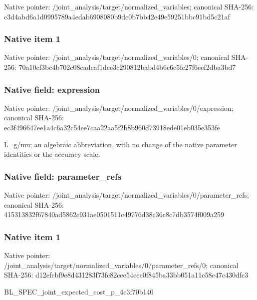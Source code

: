 \documentclass[10pt,a4paper]{article}
\begin{document}
Native pointer: /joint\_analysis/target/n\allowbreak{}ormalized\_variables; canonical SHA-256: c3d4abd6a1d0995789a4edab\allowbreak{}6908080b9dc0b7bb42e49e59\allowbreak{}251bbc91bd5c21af



\subsubsection{Native item 1}


Native pointer: /joint\_analysis/target/n\allowbreak{}ormalized\_variables/0; canonical SHA-256: 70a10cf3bc4b702c08cadcaf\allowbreak{}1dce3c290812babd4b6c6c5f\allowbreak{}c27f6eef2dba3bd7



\subsubsection{Native field: expression}


Native pointer: /joint\_analysis/target/n\allowbreak{}ormalized\_variables/0/ex\allowbreak{}pression; canonical SHA-256: ec3f496647ee1a4c6a32c54e\allowbreak{}e7caa22aa5f2b8b960d73918\allowbreak{}ede01eb035e353fe


L\_g/mu; an algebraic abbreviation, with no change of the native parameter identities or the accuracy scale.


\subsubsection{Native field: parameter\_refs}


Native pointer: /joint\_analysis/target/n\allowbreak{}ormalized\_variables/0/pa\allowbreak{}rameter\_refs; canonical SHA-256: 415313832f67840ad5862c93\allowbreak{}1ae0501511c49776d38c36c8\allowbreak{}c7db3574f009a259



\subsubsection{Native item 1}


Native pointer: /joint\_analysis/target/n\allowbreak{}ormalized\_variables/0/pa\allowbreak{}rameter\_refs/0; canonical SHA-256: d12efcbf9e8d431283f73fc8\allowbreak{}2cee54cec0f845ba33bb051a\allowbreak{}11e58c47c430dfc3


BL\_SPEC\_joint\_expected\_c\allowbreak{}ost\_p\_4e3f70b140
\end{document}

